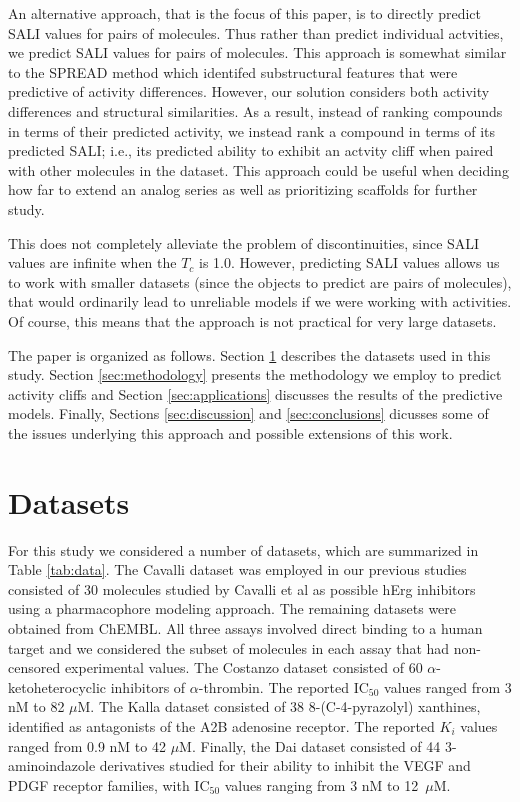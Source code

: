 \documentclass[letterpaper, 12pt]{article}
\begin{document}
An alternative approach, that is the focus of this paper, is to
directly predict SALI values for pairs of molecules. Thus rather than
predict individual actvities, we predict SALI values for pairs of
molecules. This approach is somewhat similar to the SPREAD method
\cite{Scheiber:2009fk} which identifed substructural features that
were predictive of activity differences. However, our solution
considers both activity differences and structural similarities. As a
result, instead of ranking compounds in terms of their predicted
activity, we instead rank a compound in terms of its predicted SALI;
i.e., its predicted ability to exhibit an actvity cliff when paired
with other molecules in the dataset. This approach could be useful
when deciding how far to extend an analog series as well as
prioritizing scaffolds for further study.

This does not completely alleviate the problem of discontinuities,
since SALI values are infinite when the $T_c$ is 1.0.  However,
predicting SALI values allows us to work with smaller datasets (since
the objects to predict are pairs of molecules), that would ordinarily
lead to unreliable models if we were working with activities. Of
course, this means that the approach is not practical for very large
datasets.


The paper is organized as follows. Section \ref{sec:datasets}
describes the datasets used in this study. Section
\ref{sec:methodology} presents the methodology we employ to predict
activity cliffs and Section \ref{sec:applications} discusses the
results of the predictive models. Finally, Sections
\ref{sec:discussion} and \ref{sec:conclusions} dicusses some of the
issues underlying this approach and possible extensions of this work.

\section{Datasets}            
\label{sec:datasets}
For this study we considered a number of datasets, which are
summarized in Table \ref{tab:data}. The Cavalli dataset was employed
in our previous studies consisted of 30 molecules studied by Cavalli
et al\cite{Cavalli:2002aa} as possible hErg inhibitors using a
pharmacophore modeling approach. The remaining datasets were obtained
from ChEMBL. All three assays involved direct binding to a human
target and we considered the subset of molecules in each assay that
had non-censored experimental values. The Costanzo
dataset\cite{Costanzo:2005uq} consisted of 60
$\alpha$-ketoheterocyclic inhibitors of $\alpha$-thrombin. The
reported $\mathrm{IC_{50}}$ values ranged from 3 nM to 82 $\mu$M. The
Kalla dataset\cite{Kalla:2006kx} consisted of 38 8-(C-4-pyrazolyl)
xanthines, identified as antagonists of the A2B adenosine
receptor. The reported $K_i$ values ranged from 0.9 nM to 42
$\mu$M. Finally, the Dai dataset\cite{Dai:2007kl} consisted of 44
3-aminoindazole derivatives studied for their ability to inhibit the
VEGF and PDGF receptor families, with $\mathrm{IC_{50}}$ values
ranging from 3 nM to 12~$\mu$M.
\end{document}
